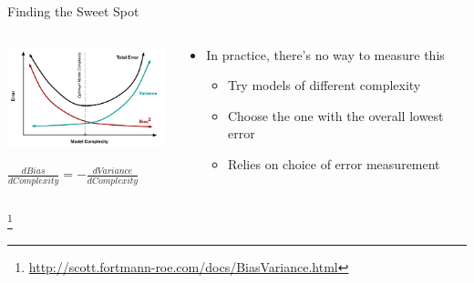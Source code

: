\documentclass[aspectratio=169]{beamer}
\begin{document}
%



%
\begin{frame}{Finding the Sweet Spot}

\begin{columns}
\begin{column}{0.5\textwidth}

\hspace{2em}
\includegraphics[height=8em]{./lectReg/biasvariance.png}

 
\hspace{6em}
$	\frac{dBias}{dComplexity} = -\frac{dVariance}{dComplexity}$
\end{column}
\begin{column}{0.5\textwidth}
\begin{itemize}
\item In practice, there's no way to measure this %
\begin{itemize}
\item Try models of different complexity
\item Choose the one with the overall lowest error
\item Relies on choice of error measurement
\end{itemize}
\end{itemize}
\end{column}
\end{columns}
\footnote{\url{http://scott.fortmann-roe.com/docs/BiasVariance.html}}
\end{frame}
\end{document}
